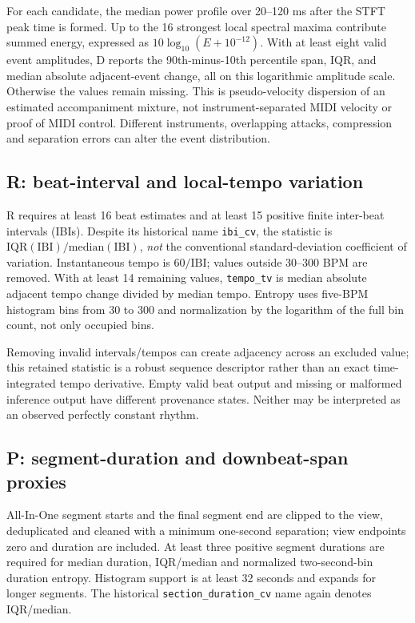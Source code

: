 For each candidate, the median power profile over 20--120 ms after the
STFT peak time is formed. Up to the 16 strongest local spectral maxima
contribute summed energy, expressed as $10\log_{10}(E+10^{-12})$.
With at least eight valid event amplitudes, D reports the 90th-minus-10th
percentile span, IQR, and median absolute adjacent-event change, all on
this logarithmic amplitude scale. Otherwise the values remain missing.
This is pseudo-velocity dispersion of an estimated accompaniment mixture,
not instrument-separated MIDI velocity or proof of MIDI control. Different
instruments, overlapping attacks, compression and separation errors can
alter the event distribution.

\subsection{R: beat-interval and local-tempo variation}
R requires at least 16 beat estimates and at least 15 positive finite
inter-beat intervals (IBIs). Despite its historical name \texttt{ibi\_cv},
the statistic is $\mathrm{IQR}(\mathrm{IBI})/\mathrm{median}(\mathrm{IBI})$,
\emph{not} the conventional standard-deviation coefficient of variation.
Instantaneous tempo is $60/\mathrm{IBI}$; values outside 30--300 BPM are
removed. With at least 14 remaining values, \texttt{tempo\_tv} is median
absolute adjacent tempo change divided by median tempo. Entropy uses
five-BPM histogram bins from 30 to 300 and normalization by the logarithm
of the full bin count, not only occupied bins.

Removing invalid intervals/tempos can create adjacency across an excluded
value; this retained statistic is a robust sequence descriptor rather than
an exact time-integrated tempo derivative. Empty valid beat output and
missing or malformed inference output have different provenance states.
Neither may be interpreted as an observed perfectly constant rhythm.

\subsection{P: segment-duration and downbeat-span proxies}
All-In-One segment starts and the final segment end are clipped to the
view, deduplicated and cleaned with a minimum one-second separation;
view endpoints zero and duration are included. At least three positive
segment durations are required for median duration, IQR/median and
normalized two-second-bin duration entropy. Histogram support is at least
32 seconds and expands for longer segments. The historical
\texttt{section\_duration\_cv} name again denotes IQR/median.

